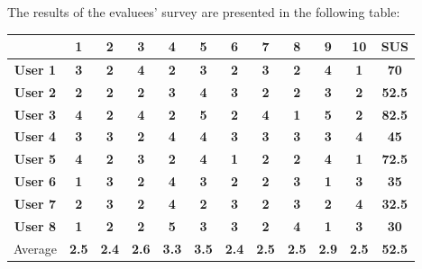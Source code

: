 	The results of the evaluees' survey are presented in the following table:
	\begin{center}
		\begin{tabular}{ c | c | c | c | c | c | c | c | c | c | c | c } 
							 & 1 & 2 & 3 & 4 & 5 & 6 & 7 & 8 & 9 & 10 & \textbf{SUS} \\
							 \hline\hline
\textbf{User 1} & \textbf{3} & \textbf{2} & \textbf{4} & \textbf{2} & \textbf{3} & \textbf{2} & \textbf{3} & \textbf{2} & \textbf{4} & \textbf{1} & \textbf{70} \\
\textbf{User 2} & \textbf{2} & \textbf{2} & \textbf{2} & \textbf{3} & \textbf{4} & \textbf{3} & \textbf{2} & \textbf{2} & \textbf{3} & \textbf{2} & \textbf{52.5} \\
\textbf{User 3} & \textbf{4} & \textbf{2} & \textbf{4} & \textbf{2} & \textbf{5} & \textbf{2} & \textbf{4} & \textbf{1} & \textbf{5} & \textbf{2} & \textbf{82.5} \\
\textbf{User 4} & \textbf{3} & \textbf{3} & \textbf{2} & \textbf{4} & \textbf{4} & \textbf{3} & \textbf{3} & \textbf{3} & \textbf{3} & \textbf{4} & \textbf{45} \\
\textbf{User 5} & \textbf{4} & \textbf{2} & \textbf{3} & \textbf{2} & \textbf{4} & \textbf{1} & \textbf{2} & \textbf{2} & \textbf{4} & \textbf{1} & \textbf{72.5} \\
\textbf{User 6} & \textbf{1} & \textbf{3} & \textbf{2} & \textbf{4} & \textbf{3} & \textbf{2} & \textbf{2} & \textbf{3} & \textbf{1} & \textbf{3} & \textbf{35} \\
\textbf{User 7} & \textbf{2} & \textbf{3} & \textbf{2} & \textbf{4} & \textbf{2} & \textbf{3} & \textbf{2} & \textbf{3} & \textbf{2} & \textbf{4} & \textbf{32.5} \\
\textbf{User 8} & \textbf{1} & \textbf{2} & \textbf{2} & \textbf{5} & \textbf{3} & \textbf{3} & \textbf{2} & \textbf{4} & \textbf{1} & \textbf{3} & \textbf{30} \\
\hline
Average & \textbf{2.5} & \textbf{2.4} & \textbf{2.6} & \textbf{3.3} & \textbf{3.5} & \textbf{2.4} & \textbf{2.5} & \textbf{2.5} & \textbf{2.9} & \textbf{2.5} & \textbf{52.5} \\
\end{tabular}
\end{center}